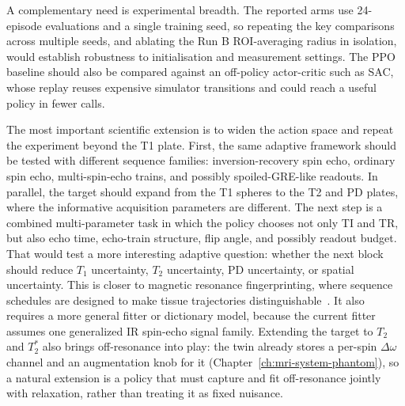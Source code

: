 A complementary need is experimental breadth. The reported arms use 24-episode
evaluations and a single training seed, so repeating the key comparisons across
multiple seeds, and ablating the Run B ROI-averaging radius in isolation, would
establish robustness to initialisation and measurement settings. The PPO
baseline should also be compared against an off-policy actor-critic such as SAC,
whose replay reuses expensive simulator transitions and could reach a useful
policy in fewer calls.

The most important scientific extension is to widen the action space and repeat
the experiment beyond the T1 plate. First, the same adaptive framework should be
tested with different sequence families: inversion-recovery spin echo, ordinary
spin echo, multi-spin-echo trains, and possibly spoiled-GRE-like readouts. In
parallel, the target should expand from the T1 spheres to the T2 and PD plates,
where the informative acquisition parameters are different. The next step is a
combined multi-parameter task in which the policy chooses not only TI and TR, but
also echo time, echo-train structure, flip angle, and possibly readout budget.
That would test a more interesting adaptive question: whether the next block
should reduce $T_1$ uncertainty, $T_2$ uncertainty, PD uncertainty, or spatial
uncertainty. This is closer to magnetic resonance fingerprinting, where sequence
schedules are designed to make tissue trajectories
distinguishable~\cite{mehta_mrf_review:2019,Jordan_MRF_AUTO:21}. It also
requires a more general fitter or dictionary model, because the current fitter
assumes one generalized IR spin-echo signal family. Extending the target to
$T_2$ and $T_2^*$ also brings off-resonance into play: the twin already stores
a per-spin $\Delta\omega$ channel and an augmentation knob for it
(Chapter~\ref{ch:mri-system-phantom}), so a natural extension is a policy that
must capture and fit off-resonance jointly with relaxation, rather than
treating it as fixed nuisance.


